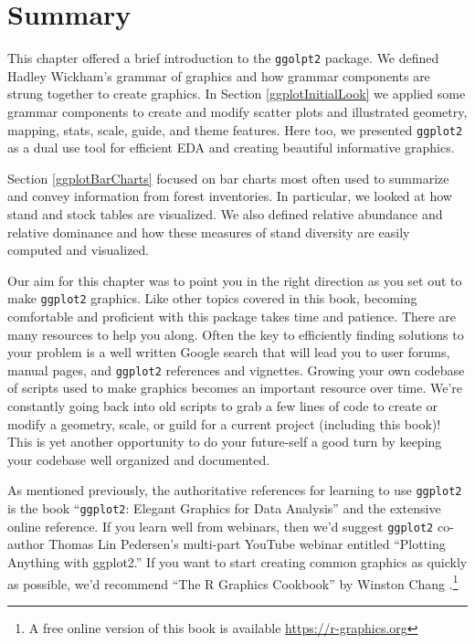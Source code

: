 \documentclass[
  11pt,
]{krantz}
\theoremstyle{definition}
\theoremstyle{definition}
\theoremstyle{definition}
\theoremstyle{definition}
\theoremstyle{remark}
\begin{document}
\hypertarget{summaryGgplot2}{%
\section{Summary}\label{summaryGgplot2}}

This chapter offered a brief introduction to the \texttt{ggolpt2} package. We defined Hadley Wickham's grammar of graphics and how grammar components are strung together to create graphics. In Section \ref{ggplotInitialLook} we applied some grammar components to create and modify scatter plots and illustrated geometry, mapping, stats, scale, guide, and theme features. Here too, we presented \texttt{ggplot2} as a dual use tool for efficient EDA and creating beautiful informative graphics.

Section \ref{ggplotBarCharts} focused on bar charts most often used to summarize and convey information from forest inventories. In particular, we looked at how stand and stock tables are visualized. We also defined relative abundance and relative dominance and how these measures of stand diversity are easily computed and visualized.

Our aim for this chapter was to point you in the right direction as you set out to make \texttt{ggplot2} graphics. Like other topics covered in this book, becoming comfortable and proficient with this package takes time and patience. There are many resources to help you along. Often the key to efficiently finding solutions to your problem is a well written Google search that will lead you to user forums, manual pages, and \texttt{ggplot2} references and vignettes. Growing your own codebase of scripts used to make graphics becomes an important resource over time. We're constantly going back into old scripts to grab a few lines of code to create or modify a geometry, scale, or guild for a current project (including this book)! This is yet another opportunity to do your future-self a good turn by keeping your codebase well organized and documented.

As mentioned previously, the authoritative references for learning to use \texttt{ggplot2} is the book ``\texttt{ggplot2}: Elegant Graphics for Data Analysis'' \citep{WickhamGgplot2Book} and the extensive online reference. If you learn well from webinars, then we'd suggest \texttt{ggplot2} co-author Thomas Lin Pedersen's multi-part YouTube webinar entitled ``Plotting Anything with ggplot2.'' If you want to start creating common graphics as quickly as possible, we'd recommend ``The R Graphics Cookbook'' by Winston Chang \citep{Chang2018}.\footnote{A free online version of this book is available \url{https://r-graphics.org}}
\end{document}
